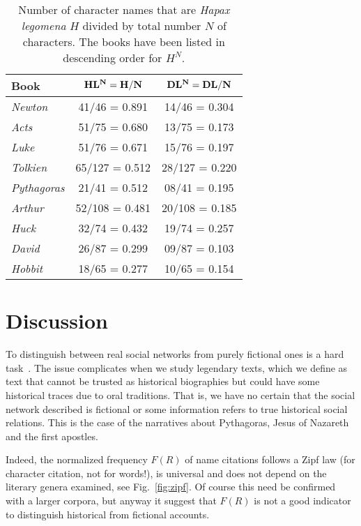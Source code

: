 \documentclass[review]{elsarticle}
\begin{document}
\begin{table}[ht]
\centering\small
\begin{tabular}{l|c|c}\hline 
\bf Book &  $\bf HL^N=H/N$ & $\bf DL^N=DL/N$ \\ \hline 
\emph{Newton} & 41/46 = 0.891 & 14/46 = 0.304 \\
\emph{Acts} & 51/75 = 0.680 & 13/75 = 0.173 \\
\emph{Luke} & 51/76 = 0.671 & 15/76 = 0.197 \\
\emph{Tolkien} & 65/127 = 0.512 & 28/127 = 0.220 \\
\emph{Pythagoras} & 21/41 = 0.512 & 08/41 = 0.195 \\
\emph{Arthur} & 52/108 = 0.481 & 20/108 = 0.185 \\
\emph{Huck} & 32/74 = 0.432 & 19/74 = 0.257 \\
\emph{David} & 26/87 = 0.299 & 09/87 = 0.103 \\
\emph{Hobbit} & 18/65 = 0.277 & 10/65 = 0.154 \\
\hline\end{tabular}
\caption{Number of character 
names that are \emph{Hapax legomena} $H$ divided by 
total number $N$ of characters. The books have been 
listed in descending order for $H^N$.}
\label{tab:hapax}
\end{table}

\section{Discussion}

To distinguish between real social networks 
from purely fictional ones is a hard
task~\cite{alberich2002,gleiser2007}. 
The issue complicates when we study legendary texts, which we define
as text that cannot be trusted as historical 
biographies but could have
some historical traces due to oral traditions. That is,
we have no certain that the social network described is
fictional or some information refers to true historical
social relations. This is the case of the narratives 
about Pythagoras, Jesus of Nazareth and the first apostles. 

Indeed, the normalized frequency $F(R)$ of name citations
follows a Zipf law (for character citation, not for words!), 
is universal and does not
depend on the literary genera examined, see Fig.~\ref{fig:zipf}.
Of course this need be confirmed with a larger corpora, but
anyway it suggest that $F(R)$ is not a good indicator 
to distinguish historical from fictional accounts.
\end{document}
